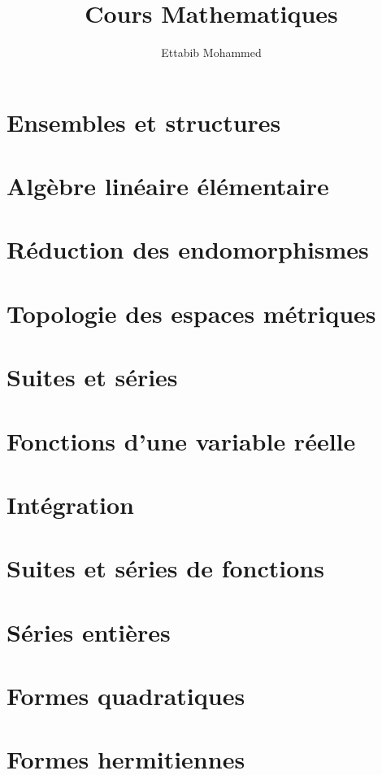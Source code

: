 \documentclass{MathBook}
\begin{document}
\title{Cours Mathematiques}
\author{Ettabib Mohammed}
\date{}
\maketitle

\tableofcontents
\chapter{Ensembles et structures }
\chapter{Algèbre linéaire élémentaire}
\chapter{Réduction des endomorphismes }
\chapter{Topologie des espaces métriques }
 \chapter{ Suites et séries }

\chapter{Fonctions d’une variable réelle }
\chapter{Intégration }
\chapter{Suites et séries de fonctions }





\chapter{Séries entières }




\chapter{Formes quadratiques }



\chapter{Formes hermitiennes }
\end{document}
